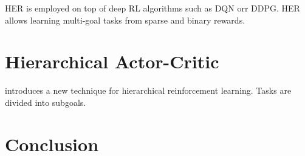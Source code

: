 \documentclass[runningheads]{llncs}
\begin{document}
HER is employed on top of deep RL algorithms such as DQN orr DDPG. HER allows learning multi-goal tasks from sparse and binary rewards.\cite{andrychowicz2017hindsight}

\section{Hierarchical Actor-Critic}

\cite{levy2017hierarchical} introduces a new technique for hierarchical reinforcement learning. Tasks are divided into subgoals.

\section{Conclusion}

%
%
%
% 
% 
%



\end{document}
